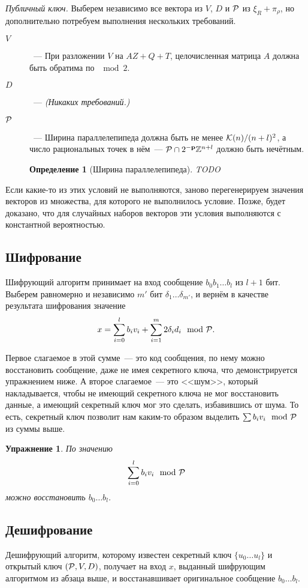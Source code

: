 \documentclass[oneside, a4paper]{article}
\theoremstyle{plain}
\newtheorem{exce}{Упражнение}
\theoremstyle{defn}
\newtheorem{defn}{Определение}
\theoremstyle{remark}
\newenvironment{definition}[1]{%
\begin{tcolorbox}[breakable,enhanced]
\begin{defn}[#1]
}{%
\end{defn}
\end{tcolorbox}
}
\newcommand\p{\ensuremath \mathbf p}
\newcommand\PP{\ensuremath \mathcal P}
\newcommand\KK{\ensuremath \mathcal K}
\newcommand\Z{\ensuremath \mathbb Z}
\begin{document}
\emph{Публичный ключ.} Выберем независимо все вектора из $V$, $D$ и $\PP$ из
$\xi_R + \pi_\rho$, но дополнительно потребуем выполнения нескольких требований.
\begin{description}
\item[$V$]~--- При разложении $V$ на $AZ + Q + T$, целочисленная матрица $A$
должна быть обратима по $\mod 2$.
\item[$D$]~--- \emph{(Никаких требований.)}
\item[$\PP$]~--- Ширина параллелепипеда должна быть не менее $\KK(n)/(n+l)^2$, а
число рациональных точек в нём~--- $\PP \cap 2^{-\p}\Z^{n+l}$ должно быть нечётным.
\begin{definition}{Ширина параллелепипеда}
TODO
\end{definition}
\end{description}
Если какие-то из этих условий не выполняются, заново перегенерируем значения
векторов из множества, для которого не выполнилось условие. Позже, будет
доказано, что для случайных наборов векторов эти условия выполняются с
константной вероятностью.

\subsection{Шифрование} Шифрующий алгоритм принимает на вход сообщение $b_0 b_1 \dots
b_l$ из $l+1$ бит. Выберем равномерно и независимо $m'$ бит $\delta_1 \dots
\delta_{m'}$, и вернём в качестве результата шифрования значение
\[
x = \sum_{i = 0}^l b_i v_i + \sum_{i = 1}^m 2 \delta_i d_i \mod \PP.
\]

Первое слагаемое в этой сумме~--- это код сообщения, по нему можно восстановить
сообщение, даже не имея секретного ключа, что демонстрируется упражнением ниже.
А второе слагаемое~--- это <<шум>>, который накладывается, чтобы не имеющий
секретного ключа не мог восстановить данные, а имеющий секретный ключ мог это
сделать, избавившись от шума. То есть, секретный ключ позволит нам каким-то
образом выделить $\sum b_i v_i \mod \PP$ из суммы выше.

\begin{exce}
По значению
\[
\sum_{i=0}^l b_i v_i \mod \PP
\]
можно восстановить $b_0 \dots b_l$.
\end{exce}

\subsection{Дешифрование} Дешифрующий алгоритм, которому известен секретный ключ
$\{u_0 \dots u_l\}$ и открытый ключ $(\PP, V, D)$, получает на вход $x$,
выданный шифрующим алгоритмом из абзаца выше, и восстанавшивает оригинальное
сообщение $b_0 \dots b_l$.
\end{document}
